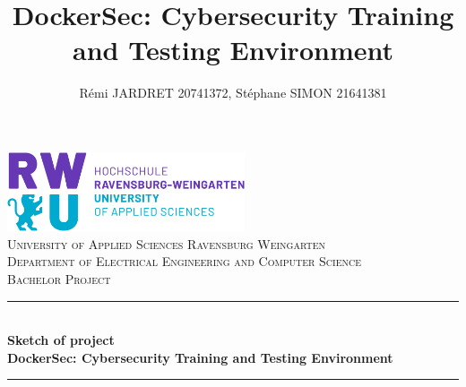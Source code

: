 \documentclass[a4paper,11pt,singlespacing]{article}
\title{DockerSec: Cybersecurity Training and Testing Environment}
\author{
	Rémi JARDRET 20741372,
	Stéphane SIMON 21641381
	}
\begin{document}
\setlength{\parindent}{0ex}


\begin{titlepage}
	
	\newcommand{\HRule}{\rule{\linewidth}{0.5mm}} %
	
	\center %
	
		
	
	\includegraphics[width=7cm]{images/rwu_logo.png}\\[1.5cm] %
	
	\textsc{\LARGE University of Applied Sciences Ravensburg Weingarten}\\[1.5cm] 
	\textsc{\Large Department of
		Electrical Engineering
		and Computer Science}\\[0.5cm]
	\textsc{\large Bachelor Project}\\[0.5cm] 
	
	
	\HRule \\[0.4cm]
	{ \huge \bfseries Sketch of project\\ DockerSec: Cybersecurity Training and Testing Environment}\\[0.4cm] 
	\HRule \\[3.5cm]
	
	

\end{titlepage}
\end{document}
